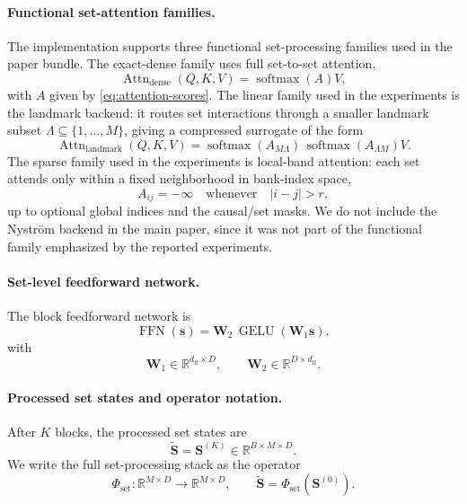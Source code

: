 \documentclass{article}
\theoremstyle{plain}
\theoremstyle{definition}
\theoremstyle{remark}
\begin{document}
\paragraph{Functional set-attention families.}
The implementation supports three functional set-processing families used in the paper bundle. The exact-dense family uses full set-to-set attention,
\begin{equation}
\label{eq:dense-set-attention-family}
\operatorname{Attn}_{\mathrm{dense}}(Q,K,V)=\operatorname{softmax}(A)V,
\end{equation}
with $A$ given by \eqref{eq:attention-scores}. The linear family used in the experiments is the landmark backend: it routes set interactions through a smaller landmark subset $\Lambda\subseteq\{1,\dots,M\}$, giving a compressed surrogate of the form
\begin{equation}
\label{eq:landmark-set-attention-family}
\operatorname{Attn}_{\mathrm{landmark}}(Q,K,V)
=
\operatorname{softmax}(A_{M\Lambda})\,
\operatorname{softmax}(A_{\Lambda M})V.
\end{equation}
The sparse family used in the experiments is local-band attention: each set attends only within a fixed neighborhood in bank-index space,
\begin{equation}
\label{eq:local-band-set-attention-family}
A_{ij}=-\infty\quad\text{whenever}\quad |i-j|>r,
\end{equation}
up to optional global indices and the causal/set masks. We do not include the Nystr\"om backend in the main paper, since it was not part of the functional family emphasized by the reported experiments.

\paragraph{Set-level feedforward network.}
The block feedforward network is
\begin{equation}
\label{eq:ffn}
\operatorname{FFN}(\mathbf s)=\mathbf W_2\,\operatorname{GELU}(\mathbf W_1\mathbf s),
\end{equation}
with
\begin{equation}
\mathbf W_1\in\mathbb R^{d_{\mathrm{ff}}\times D},
\qquad
\mathbf W_2\in\mathbb R^{D\times d_{\mathrm{ff}}}.
\end{equation}

\paragraph{Processed set states and operator notation.}
After $K$ blocks, the processed set states are
\begin{equation}
\label{eq:final-set-states}
\widetilde{\mathbf S}=\mathbf S^{(K)}\in\mathbb R^{B\times M\times D}.
\end{equation}
We write the full set-processing stack as the operator
\begin{equation}
\label{eq:set-stack-operator}
\Phi_{\mathrm{set}}:\mathbb R^{M\times D}\to\mathbb R^{M\times D},
\qquad
\widetilde{\mathbf S}=\Phi_{\mathrm{set}}(\mathbf S^{(0)}).
\end{equation}
\end{document}
